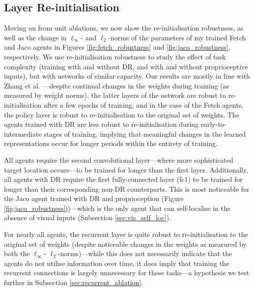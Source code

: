 \hypertarget{layer-re-initialisation-1}{%
\subsection{Layer Re-initialisation}\label{layer-re-initialisation-1}}

\label{sec:layer_ablations}

Moving on from unit ablations, we now show the re-initialisation
robustness, as well as the change in \(\ell_\infty\)- and
\(\ell_2\)-norms of the parameters of my trained Fetch and Jaco agents
in Figures \ref{fig:fetch_robustness} and \ref{fig:jaco_robustness},
respectively. We use re-initialisation robustness to study the effect of
task complexity (training with and without DR, and with and without
proprioceptive inputs), but with networks of similar capacity. Our
results are mostly in line with Zhang et al.
\cite{zhang2019all}---despite continual changes in the weights during
training (as measured by weight norms), the latter layers of the network
are robust to re-initialisation after a few epochs of training, and in
the case of the Fetch agents, the policy layer is robust to
re-initialisation to the original set of weights. The agents trained
with DR are less robust to re-initialisation during
early-to-intermediate stages of training, implying that meaningful
changes in the learned representations occur for longer periods within
the entirety of training.

All agents require the second convolutional layer---where more
sophisticated target location occurs---to be trained for longer than the
first layer. Additionally, all agents with DR require the first
fully-connected layer (fc1) to be trained for longer than their
corresponding non-DR counterparts. This is most noticeable for the Jaco
agent trained with DR and proprioception (Figure
\ref{fig:jaco_robustness}j)---which is the only agent that can
self-localise in the absence of visual inputs (Subsection
\ref{sec:vis_self_loc}).

For nearly all agents, the recurrent layer is quite robust to
re-initialisation to the original set of weights (despite noticeable
changes in the weights as measured by both the \(\ell_\infty\)-
\(\ell_2\)-norms)---while this does not necessarily indicate that the
agents do not utilise information over time, it does imply that training
the recurrent connections is largely unnecessary for these tasks---a
hypothesis we test further in Subsection \ref{sec:recurrent_ablation}.


